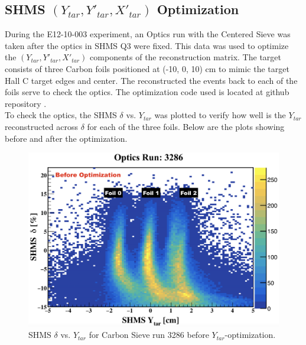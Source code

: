 \documentclass[11pt]{article}
\begin{document}
\subsection{SHMS $(Y_{tar}, Y'_{tar}, X'_{tar})$ Optimization}
During the E12-10-003 experiment, an Optics run with the Centered Sieve was taken after the optics in SHMS Q3 were fixed. This data was used to
optimize the $(Y_{tar}, Y'_{tar}, X'_{tar})$ components of the reconstruction matrix. The target consists of three Carbon foils positioned at
(-10, 0, 10) cm to mimic the target Hall C target edges and center. The reconstructed the events back to each of the foils serve to check the optics.
The optimization code used is located at github repository \cite{shmsOpt_git_repo}. \\
\indent To check the optics, the SHMS $\delta$ vs. $Y_{tar}$ was plotted to verify how well is the $Y_{tar}$ reconstructed across $\delta$ for each of the
three foils. Below are the plots showing before and after the optimization.
\begin{figure}[h!]
  \centering
  \includegraphics[scale=0.4]{plots/SHMS_delta_vs_ytar_3286_beforeOptim.png}
  \caption{SHMS $\delta$ vs. $Y_{tar}$ for Carbon Sieve run 3286 before $Y_{tar}$-optimization.}
  \label{fig:shmsYtar_beforeOptim}
\end{figure}
\newpage
\end{document}
